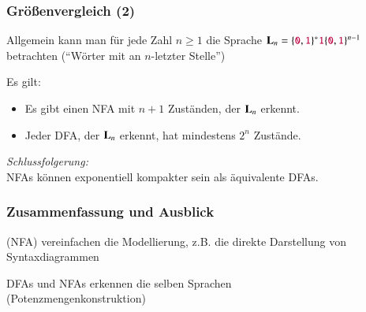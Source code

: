 \documentclass[onlymath,handout]{beamer}
\begin{document}
\begin{frame}\frametitle{Größenvergleich (2)}

Allgemein kann man für jede Zahl $n\geq 1$ die Sprache $\textbf{\textcolor{black}{L}}_n= \{\mathtt{\textcolor{purple}{0}},\mathtt{\textcolor{purple}{1}}\}^* \mathtt{\textcolor{purple}{1}} \{\mathtt{\textcolor{purple}{0}},\mathtt{\textcolor{purple}{1}}\}^{n-1} $ betrachten ("`Wörter mit  an $n$-letzter Stelle"')
\medskip

Es gilt:
\begin{itemize}
\item Es gibt einen NFA mit $n+1$ Zuständen, der $\textbf{\textcolor{black}{L}}_n$ erkennt.
\item Jeder DFA, der $\textbf{\textcolor{black}{L}}_n$ erkennt, hat mindestens $2^n$ Zustände.
\end{itemize}

\bigskip

\emph{Schlussfolgerung:}\\
\alert{NFAs können exponentiell kompakter sein als äquivalente DFAs.}

\end{frame}
% 
% 
% 
% 
% 
% 

\begin{frame}\frametitle{Zusammenfassung und Ausblick}

 (NFA) vereinfachen die Modellierung, z.B. die direkte Darstellung von Syntaxdiagrammen
\bigskip

 DFAs und NFAs erkennen die selben Sprachen\\
\textcolor{devilscss}{(Potenzmengenkonstruktion)}
\bigskip



\end{frame}
\end{document}
